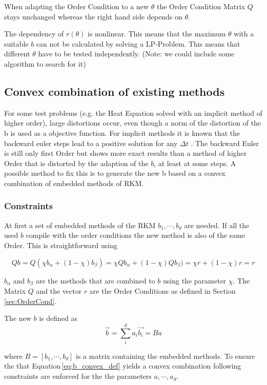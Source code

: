 \documentclass{article}
\begin{document}
When adapting the Order Condition to a new $\theta$ the Order Condition Matrix $Q$ stays unchanged whereas the right hand side depends on $\theta$.

The dependency of $r(\theta)$ is nonlinear. This means that the maximum $\theta$ with a suitable $b$ can not be calculated by solving a LP-Problem. This means that different $\theta$ have to be tested independently. 
(Note: we could include some algorithm to search for it)


\subsection{Convex combination of existing methods}\label{sec:convex}
For some test problems (e.g. the Heat Equation solved with an implicit method of higher order), large distortions occur, even though a norm of the distortion of the b is used as a objective function. 
For implicit methods it is known that the backward euler steps lead to a positive solution for any $\Delta t$ \cite{hundsdorfer_numerical_2003}. The backward Euler is still only first Order but shows more exact results than a method of higher Order that is distorted by the adaption of the $b$, at least at some steps. 
A possible method to fix this is to generate the new b based on a convex combination of embedded methods of RKM. 

\subsubsection{Constraints}
At first a set of embedded methods of the RKM $b_1,\cdots,b_d$ are needed. 
If all the used $b$ compile with the order conditions the new method is also of the same Order.
This is straightforward using

$$ Q b = Q (\chi b_{\alpha} + (1-\chi) b_{\beta}) = \chi Q  b_{\alpha} + (1-\chi) Q b_{\beta}) = \chi r + (1-\chi) r = r$$

$b_{\alpha}$ and $b_{\beta}$ are the methods that are combined to $b$ using the parameter $\chi$. The Matrix $Q$ and the vector $r$ are the Order Conditions as defined in Section\,\ref{sec:OrderCond}.

The new $b$ is defined as 
\begin{equation}\label{eq:b_convex_def}
\vec{b} = \sum_i^d a_i \vec{b_i} = Ba
\end{equation}


where $B=\left[b_1,\cdots,b_d \right]$ is a matrix containing the embedded methods.  
To ensure the that Equation\,\ref{eq:b_convex_def} yields a convex combination following constraints are enforced for the  the parameters $a,\cdots,a_d$.
\end{document}
